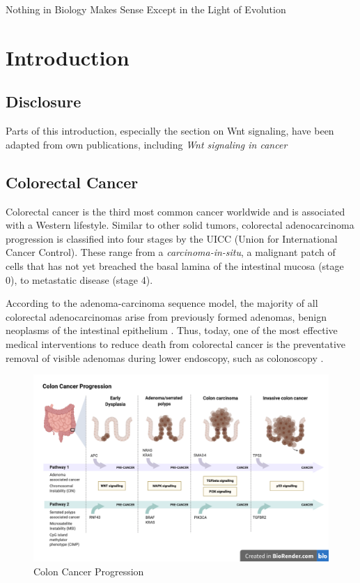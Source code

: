 \begin{savequote}[75mm]
Nothing in Biology Makes Sense Except in the Light of Evolution
\end{savequote}

\chapter{Introduction}
\label{introduction}
\begin{flushleft}
\setlength{\parindent}{7ex}
\section{Disclosure}
Parts of this introduction, especially the section on Wnt signaling, have been adapted from own publications, including \textit{Wnt signaling in cancer} \cite{Zhan2017}

\section{Colorectal Cancer}
Colorectal cancer is the third most common cancer worldwide and is associated with a Western lifestyle. Similar to other solid tumors, colorectal adenocarcinoma progression is classified into four stages by the UICC (Union for International Cancer Control). These range from a \textit{carcinoma-in-situ}, a malignant patch of cells that has not yet breached the basal lamina of the intestinal mucosa (stage 0), to metastatic disease (stage 4).\par

According to the adenoma-carcinoma sequence model, the majority of all colorectal adenocarcinomas arise from previously formed adenomas, benign neoplasms of the intestinal epithelium \cite{Cho1992}. Thus, today, one of the most effective medical interventions to reduce death from colorectal cancer is the preventative removal of visible adenomas during lower endoscopy, such as colonoscopy \cite{Nishihara2013Long-TermEndoscopy}.\par

\begin{figure}[h]
\centering
\includegraphics[scale=.35]{figures/colon_cancer_progression.png}
\caption{Colon Cancer Progression}
\label{colon_cancer_progression}
\end{figure}


\end{flushleft}

